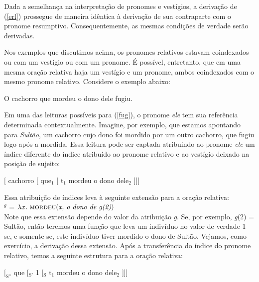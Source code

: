 \bigskip

\n Dada a semelhança na interpretação de pronomes e vestígios, a
derivação de (\ref{erl}) prossegue de maneira idêntica à derivação
de sua contraparte com o pronome resumptivo. Consequentemente, as
mesmas condições de verdade serão derivadas.

Nos exemplos que discutimos acima, os pronomes relativos estavam
coindexados ou com um vestígio ou com um pronome. É possível,
entretanto, que em uma mesma oração relativa haja um vestígio e um
pronome, ambos coindexados com o mesmo pronome relativo. Considere
o exemplo abaixo:

\begin{exe}
    \ex O cachorro que mordeu o dono dele fugiu. \label{fug}
\end{exe}

\n Em uma das leituras possíveis para (\ref{fug}), o pronome
\textit{ele} tem sua referência determinada contextualmente. Imagine, por exemplo,
que estamos apontando para \textit{Sultão}, um cachorro cujo dono
foi mordido por um outro cachorro, que fugiu logo após a mordida.
Essa leitura pode ser captada atribuindo ao pronome \textit{ele}
um índice diferente do índice atribuído ao pronome relativo e ao
vestígio deixado na posição de sujeito:

\begin{exe}
    \ex $[$ cachorro [ que$_{1}$ [ t$_{1}$ mordeu o dono dele$_{2}$ ]]]
    \label{est}
\end{exe}

\n Essa atribuição de índices leva à seguinte extensão para a
oração relativa:\\

\n {}$^{g}$ = $\lambda x.\ \text{\textsc{mordeu}(\textit{x, o dono de g(2)})}$\\

\n Note que essa extensão depende do valor da atribuição
\textit{g}. Se, por exemplo, \textit{g}(2) = Sultão, então teremos
uma função que leva um indivíduo no valor de verdade 1 se, e
somente se, este indivíduo tiver mordido o dono de Sultão. Vejamos, como exercício, a derivação dessa extensão. Após a transferência do índice do
pronome relativo, temos a seguinte estrutura para a oração relativa:

\begin{exe}
    \ex $[_{\text{S}''}$ que
     [$_{\text{S}'}$ 1 [$_{\text{S}}$ t$_{1}$ mordeu o dono dele$_{2}$
     ]]]   \label{esa}
\end{exe}

